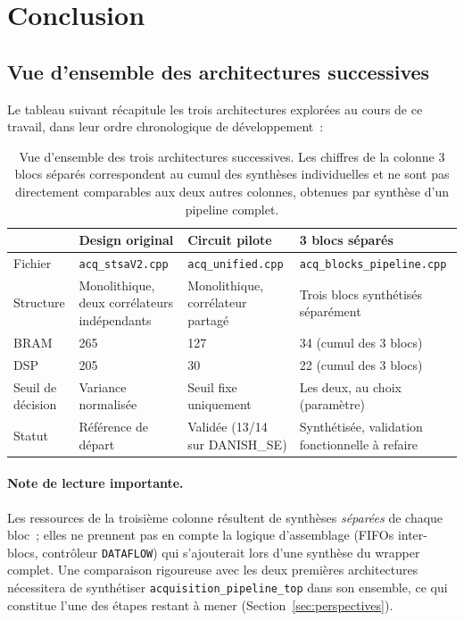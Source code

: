\documentclass[11pt,a4paper]{article}
\providecommand{\og}{\guillemotleft{}}
\providecommand{\fg}{\guillemotright{}}
\begin{document}
\section{Conclusion}

\subsection{Vue d'ensemble des architectures successives}

Le tableau suivant récapitule les trois architectures explorées au cours de ce travail, dans leur ordre chronologique de développement~:

\begin{table}[H]
\centering
\renewcommand{\arraystretch}{1.4}
\small
\begin{tabular}{p{3.4cm}p{3.4cm}p{3.4cm}p{3.4cm}}
\toprule
 & \textbf{Design original} & \textbf{Circuit pilote} & \textbf{3 blocs séparés} \\
\midrule
Fichier & \texttt{acq\_stsaV2.cpp} & \texttt{acq\_unified.cpp} & \texttt{acq\_blocks\_pipeline.cpp} \\
Structure & Monolithique, deux corrélateurs indépendants & Monolithique, corrélateur partagé & Trois blocs synthétisés séparément \\
BRAM & 265 & 127 & 34 (cumul des 3 blocs) \\
DSP & 205 & 30 & 22 (cumul des 3 blocs) \\
Seuil de décision & Variance normalisée & Seuil fixe uniquement & Les deux, au choix (paramètre) \\
Statut & Référence de départ & Validée (13/14 sur DANISH\_SE) & Synthétisée, validation fonctionnelle à refaire \\
\bottomrule
\end{tabular}
\caption{Vue d'ensemble des trois architectures successives. Les chiffres de la colonne \og{}3 blocs séparés\fg{} correspondent au cumul des synthèses individuelles et ne sont pas directement comparables aux deux autres colonnes, obtenues par synthèse d'un pipeline complet.}
\end{table}

\paragraph{Note de lecture importante.} Les ressources de la troisième colonne résultent de synthèses \textit{séparées} de chaque bloc~; elles ne prennent pas en compte la logique d'assemblage (FIFOs inter-blocs, contrôleur \texttt{DATAFLOW}) qui s'ajouterait lors d'une synthèse du wrapper complet. Une comparaison rigoureuse avec les deux premières architectures nécessitera de synthétiser \texttt{acquisition\_pipeline\_top} dans son ensemble, ce qui constitue l'une des étapes restant à mener (Section~\ref{sec:perspectives}).
\end{document}
